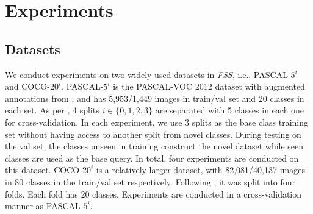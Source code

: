 \documentclass[journal]{IEEEtran}
\begin{document}
\section{Experiments}
\subsection{Datasets} We conduct experiments on two widely used datasets in \textit{FSS}, i.e., PASCAL-$5^{i}$ and COCO-$20^{i}$. 
PASCAL-$5^{i}$ is the PASCAL-VOC 2012 dataset \cite{everingham2010pascal} with augmented annotations from \cite{hariharan2014simultaneous}, and has 5,953/1,449 images in train/val set and 20 classes in each set. 
As per \cite{shaban2017one}, 4 splits $i\in \{0,1,2,3\}$ are separated with 5 classes in each one for cross-validation.
In each experiment, we use 3 splits as the base class training set without having access to another split from novel classes. 
During testing on the val set, the classes unseen in training construct the novel dataset while seen classes are used as the base query.
In total, four experiments are conducted on this dataset. 
COCO-$20^{i}$ is a relatively larger dataset, with 82,081/40,137 images in 80 classes in the train/val set respectively. 
Following \cite{nguyen2019feature}, it was split into four folds. 
Each fold has 20 classes. 
Experiments are conducted in a cross-validation manner as PASCAL-$5^{i}$.
\end{document}
